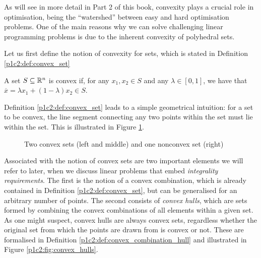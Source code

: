 As will see in more detail in Part 2 of this book, convexity plays a crucial role in optimisation, being the ``watershed'' between easy and hard optimisation problems. One of the main reasons why we can solve challenging linear programming problems is due to the inherent convexity of polyhedral sets.

Let us first define the notion of convexity for sets, which is stated in Definition \ref{p1c2:def:convex_set} 

\begin{definition}\label{p1c2:def:convex_set} 
	A set $S \subseteq \mathbb{R}^n$ is convex if, for any $x_1,x_2 \in S$ and any $\lambda \in [0,1]$, we have that $\overline{x} = \lambda x_1 + (1-\lambda) x_2 \in S$.
\end{definition}

Definition \ref{p1c2:def:convex_set} leads to a simple geometrical intuition: for a set to be convex, the line segment connecting any two points within the set must lie within the set. This is illustrated in Figure \ref{p1c2:fig:convex_sets}.

\begin{figure}
	\caption{Two convex sets (left and middle) and one nonconvex set (right)} \label{p1c2:fig:convex_sets}
\end{figure}

Associated with the notion of convex sets are two important elements we will refer to later, when we discuss linear problems that embed \emph{integrality requirements}. The first is the notion of a convex combination, which is already contained in Definition \ref{p1c2:def:convex_set}, but can be generalised for an arbitrary number of points. The second consists of \emph{convex hulls}, which are sets formed by combining the convex combinations of all elements within a given set. As one might suspect, convex hulls are always convex sets, regardless whether the original set from which the points are drawn from is convex or not. These are formalised in Definition \ref{p1c2:def:convex_combination_hull} and illustrated in Figure \ref{p1c2:fig:convex_hulls}.

